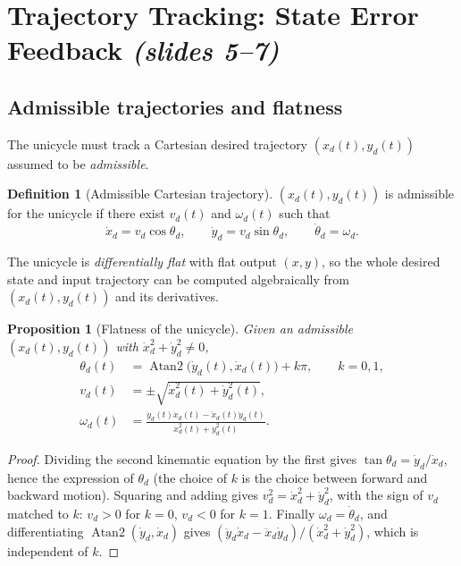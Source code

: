 \documentclass[11pt,a4paper]{article}
\newcommand{\vd}{v_d}
\newcommand{\omd}{\omega_d}
\DeclareMathOperator{\atan}{Atan2}
\theoremstyle{plain}
\newtheorem{proposition}[theorem]{Proposition}
\theoremstyle{definition}
\newtheorem{definition}[theorem]{Definition}
\theoremstyle{remark}
\begin{document}
\section{Trajectory Tracking: State Error Feedback \texorpdfstring{\emph{(slides 5--7)}}{(slides 5--7)}}

\subsection{Admissible trajectories and flatness}

The unicycle must track a Cartesian desired trajectory $(x_d(t),y_d(t))$ assumed to be \emph{admissible}.

\begin{definition}[Admissible Cartesian trajectory]
$(x_d(t),y_d(t))$ is admissible for the unicycle if there exist $\vd(t)$ and $\omd(t)$ such that
\[
\dot x_d=\vd\cos\theta_d,\qquad \dot y_d=\vd\sin\theta_d,\qquad \dot\theta_d=\omd .
\]
\end{definition}

The unicycle is \emph{differentially flat} with flat output $(x,y)$, so the whole desired state and input trajectory can be computed algebraically from $(x_d(t),y_d(t))$ and its derivatives.

\begin{proposition}[Flatness of the unicycle]\label{prop:flat}
Given an admissible $(x_d(t),y_d(t))$ with $\dot x_d^2+\dot y_d^2\neq0$,
\begin{align}
\theta_d(t)&=\atan\bigl(\dot y_d(t),\dot x_d(t)\bigr)+k\pi,\qquad k=0,1,\\
\vd(t)&=\pm\sqrt{\dot x_d^2(t)+\dot y_d^2(t)},\\
\omd(t)&=\frac{\ddot y_d(t)\dot x_d(t)-\ddot x_d(t)\dot y_d(t)}{\dot x_d^2(t)+\dot y_d^2(t)} .
\end{align}
\end{proposition}
\begin{proof}
Dividing the second kinematic equation by the first gives $\tan\theta_d=\dot y_d/\dot x_d$, hence the expression of $\theta_d$ (the choice of $k$ is the choice between forward and backward motion). Squaring and adding gives $\vd^2=\dot x_d^2+\dot y_d^2$, with the sign of $\vd$ matched to $k$: $\vd>0$ for $k=0$, $\vd<0$ for $k=1$. Finally $\omd=\dot\theta_d$, and differentiating $\atan(\dot y_d,\dot x_d)$ gives $(\ddot y_d\dot x_d-\ddot x_d\dot y_d)/(\dot x_d^2+\dot y_d^2)$, which is independent of $k$.
\end{proof}
\end{document}
